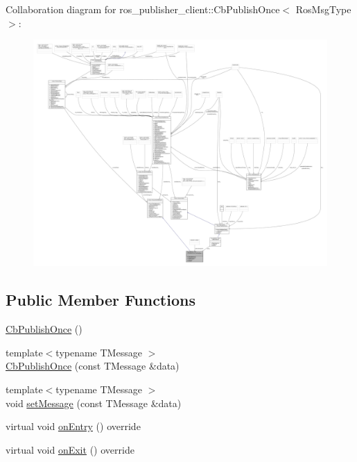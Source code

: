 Collaboration diagram for ros\+\_\+publisher\+\_\+client\+:\+:Cb\+Publish\+Once$<$ Ros\+Msg\+Type $>$\+:
\nopagebreak
\begin{figure}[H]
\begin{center}
\leavevmode
\includegraphics[width=350pt]{classros__publisher__client_1_1CbPublishOnce__coll__graph}
\end{center}
\end{figure}
\subsection*{Public Member Functions}
\begin{DoxyCompactItemize}
\item 
\hyperlink{classros__publisher__client_1_1CbPublishOnce_a7e58cbae17032aef05161697b7a061c5}{Cb\+Publish\+Once} ()
\item 
{\footnotesize template$<$typename T\+Message $>$ }\\\hyperlink{classros__publisher__client_1_1CbPublishOnce_a354897ea9a30ab5d95acc8837bf9ef0f}{Cb\+Publish\+Once} (const T\+Message \&data)
\item 
{\footnotesize template$<$typename T\+Message $>$ }\\void \hyperlink{classros__publisher__client_1_1CbPublishOnce_a06bef500e116390ee85a790401e600d8}{set\+Message} (const T\+Message \&data)
\item 
virtual void \hyperlink{classros__publisher__client_1_1CbPublishOnce_a223cb50cd7e4041d42106eb600575bae}{on\+Entry} () override
\item 
virtual void \hyperlink{classros__publisher__client_1_1CbPublishOnce_a879c967bb3e5e894e61256629636fcbd}{on\+Exit} () override
\end{DoxyCompactItemize}
